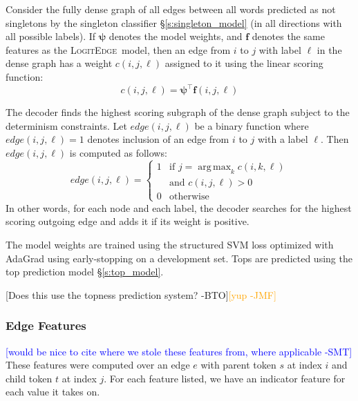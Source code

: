 \documentclass[11pt]{article}
\DeclareMathOperator*{\argmax}{arg\,max}
\newcommand{\bocomment}[1]{\textcolor{Bittersweet}{[#1 -BTO]}}
\newcommand{\sam}[1]{\textcolor{blue}{[#1 -SMT]}}
\newcommand{\jmf}[1]{\textcolor{orange}{[#1 -JMF]}}
\newcommand{\logitedge}{\textsc{LogitEdge}}
\begin{document}
Consider the fully dense graph of all edges between all words predicted
as not singletons by the singleton classifier \S\ref{s:singleton_model} (in all
directions with all possible labels).  If $\bm\psi$ denotes the model
weights, and $\bm{f}$ denotes the same features as the
\logitedge~model, then an edge from $i$ to $j$ with label $\ell$ in the
dense graph has a weight $c(i,j,\ell)$ assigned to it using the linear
scoring function:
\[
c(i,j,\ell) = \bm\psi^\top \bm{f}(i,j,\ell)
\]

The decoder finds the highest scoring subgraph of the dense graph
subject to the determinism constraints.  Let $edge(i,j,\ell)$ be a
binary function where $edge(i,j,\ell) = 1 $ denotes inclusion of an edge
from $i$ to $j$ with a label $\ell$.  Then $edge(i,j,\ell)$ is computed
as follows:
\[
edge(i,j,\ell) =
\begin{cases}
1 & \text{if } j = \argmax_{k} c(i,k,\ell) \\
& \text{and } c(i,j,\ell) > 0 \\
0 & \text{otherwise}
\end{cases}
\]
In other words, for each node and each label, the decoder searches for
the highest scoring outgoing edge and adds it if its weight is
positive.

The model weights are trained using the structured SVM loss optimized
with AdaGrad \cite{duchi_adaptive_2011} using early-stopping on a
development set.  Tops are predicted using the top prediction model
\S\ref{s:top_model}.

\bocomment{Does this use the topness prediction system?}\jmf{yup}



\subsubsection{Edge Features}
\label{s:edgefeatures}

\label{s:features}

\sam{would be nice to cite where we stole these features from, where applicable}
These features were computed over an edge $e$ with parent token $s$ at index
$i$ and child token $t$ at index $j$. 
For each feature listed, we have an indicator feature for each value it takes
on.
\end{document}
